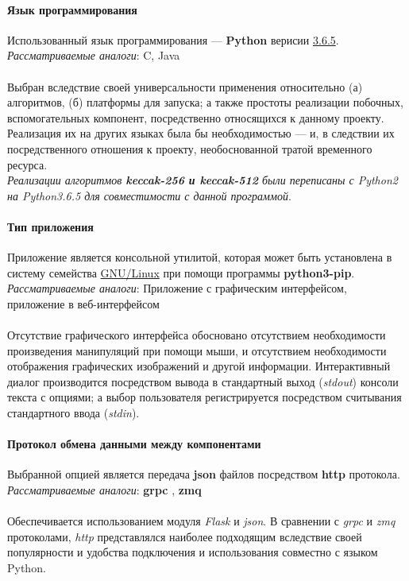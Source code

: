 \paragraph{Язык программирования}
Использованный язык программирования --- \textbf{Python} верисии
\underline{3.6.5}.\\
\emph{Рассматриваемые аналоги}: C, Java\\\\
Выбран вследствие своей универсальности применения
относительно (а) алгоритмов, (б) платформы для запуска; а также простоты
реализации побочных, вспомогательных компонент, посредственно относящихся к
данному проекту. Реализация их на других языках была бы необходимостью --- и, в
следствии их посредственного отношения к проекту, необоснованной тратой
временного ресурса.\\
\emph{Реализации алгоритмов \textbf{keccak-256 \emph{ и } keccak-512} были
переписаны с Python2 на Python3.6.5 для совместимости с данной программой}.

\paragraph{Тип приложения}
Приложение является консольной утилитой, которая может быть установлена в
систему семейства \underline{GNU/Linux} при помощи программы
\textbf{python3-pip}.\\
\emph{Рассматриваемые аналоги}: Приложение с графическим интерфейсом,
приложение в веб-интерфейсом\\\\
Отсутствие графического интерфейса обосновано отсутствием
необходимости произведения манипуляций при помощи мыши, и отсутствием
необходимости отображения графических изображений и другой информации.
Интерактивный диалог производится посредством вывода в стандартный выход
(\emph{stdout}) консоли текста с опциями; а выбор пользователя регистрируется
посредством считывания стандартного ввода (\emph{stdin}).

\paragraph{Протокол обмена данными между компонентами}
Выбранной опцией является передача \textbf{json} файлов посредством \textbf{http} протокола.\\
\emph{Рассматриваемые аналоги}: \textbf{grpc} \cite{grpc}, \textbf{zmq} \cite{zmq}\\\\
Обеспечивается использованием модуля \emph{Flask} \cite{flask} и \emph{json}. В сравнении
с \emph{grpc} и \textit{zmq} протоколами, \emph{http}
представлялся наиболее подходящим вследствие своей популярности и удобства
подключения и использования совместно с языком Python.

